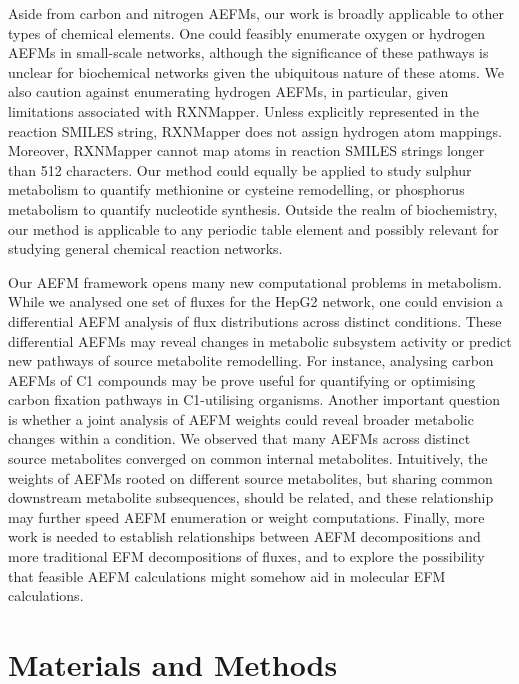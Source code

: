 \documentclass[12pt]{article}
\begin{document}
Aside from carbon and nitrogen AEFMs, our work is broadly applicable to
other types of chemical elements. One could feasibly enumerate oxygen or
hydrogen AEFMs in small-scale networks, although the significance of these
pathways is unclear for biochemical networks given the ubiquitous nature
of these atoms. We also caution against enumerating hydrogen AEFMs, in
particular, given limitations associated with RXNMapper. Unless explicitly
represented in the reaction SMILES string, RXNMapper does not assign
hydrogen atom mappings. Moreover, RXNMapper cannot map atoms in reaction
SMILES strings longer than 512 characters. Our method could equally be
applied to study sulphur metabolism to quantify methionine or cysteine
remodelling, or phosphorus metabolism to quantify nucleotide synthesis.
Outside the realm of biochemistry, our method is applicable to any
periodic table element and possibly relevant for studying general chemical
reaction networks. 

Our AEFM framework opens many new computational problems in metabolism.
While we analysed one set of fluxes for the HepG2 network, one could
envision a differential AEFM analysis of flux distributions across
distinct conditions. These differential AEFMs may reveal changes in
metabolic subsystem activity or predict new pathways of source metabolite
remodelling. For instance, analysing carbon AEFMs of C1 compounds may be
prove useful for quantifying or optimising carbon fixation pathways in
C1-utilising organisms. Another important question is whether a joint
analysis of AEFM weights could reveal broader metabolic changes within
a condition. We observed that many AEFMs across distinct source
metabolites converged on common internal metabolites. Intuitively, the
weights of AEFMs rooted on different source metabolites, but sharing
common downstream metabolite subsequences, should be related, and these
relationship may further speed AEFM enumeration or weight computations.
Finally, more work is needed to establish relationships between AEFM
decompositions and more traditional EFM decompositions of fluxes, and to
explore the possibility that feasible AEFM calculations might somehow aid
in molecular EFM calculations.

\section*{Materials and Methods}

\end{document}
